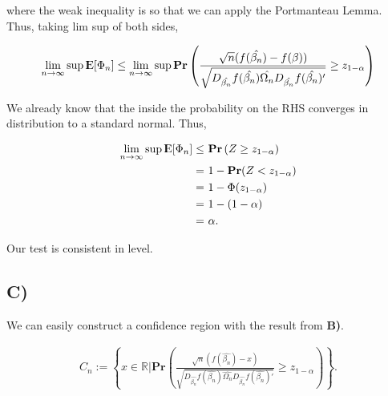 \documentclass[12pt]{paper}
\newcommand{\E}{{\rm I\kern-.3em E}}
\begin{document}
where the weak inequality is so that we can apply the Portmanteau Lemma. Thus, taking lim sup of both sides,

\begin{align*}
\lim_{n \to \infty}\sup \E[\Phi_n] 
\leq
\lim_{n \to \infty} \sup \textbf{Pr}\left(
\frac{\sqrt{n}(f(\hat{\beta_n})-f(\beta))}{\sqrt{D_{\hat{\beta_n}}f(\hat{\beta_n}) \hat{\Omega_n} D_{\hat{\beta_n}}f(\hat{\beta_n})'}}
\geq
z_{1-\alpha}
\right)
\end{align*}

We already know that the inside the probability on the RHS converges in distribution to a standard normal. Thus,

\begin{align*}
\lim_{n \to \infty} \sup \E[\Phi_n]  \leq& ~\textbf{Pr}\left(Z \geq z_{1-\alpha} \right)\\
=&~1-\textbf{Pr}(Z<z_{1-\alpha})\\
=&~1-\Phi(z_{1-\alpha})\\
=&~1-(1-\alpha)\\
=&~\alpha.
\end{align*}


Our test is consistent in level.



\subsection*{C)}


We can easily construct a confidence region with the result from \textbf{B)}.

\begin{align*}
C_n:=\left \{ 
x \in \mathbb{R}|
\textbf{Pr}\left(
\frac{\sqrt{n}(f(\hat{\beta_n})-x)}{\sqrt{D_{\hat{\beta_n}}f(\hat{\beta_n}) \hat{\Omega_n} D_{\hat{\beta_n}}f(\hat{\beta_n})'}}
\geq
z_{1-\alpha}
\right)
\right \}.
\end{align*}
\end{document}
